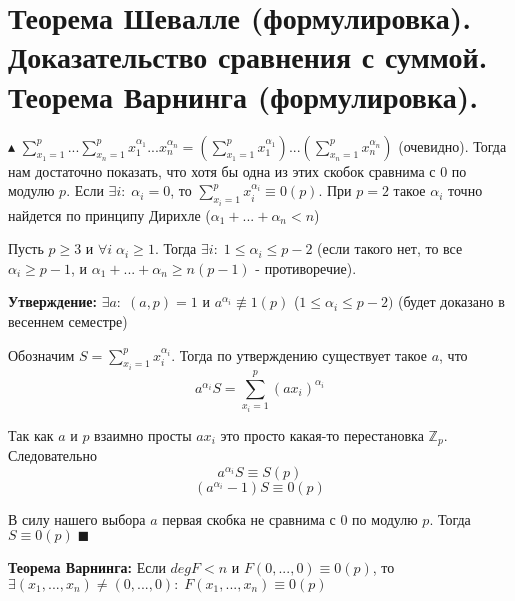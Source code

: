 \section{Теорема Шевалле (формулировка). Доказательство сравнения с суммой. Теорема Варнинга (формулировка).}
\par $\blacktriangle$ $\sum\limits_{x_1=1}^p...\sum\limits_{x_n=1}^px_1^{\alpha_1}...x_n^{\alpha_n} = \left(\sum\limits_{x_1=1}^px_1^{\alpha_1}\right)...\left(\sum\limits_{x_n=1}^px_n^{\alpha_n}\right)$ (очевидно). Тогда нам достаточно показать, что хотя бы одна из этих скобок сравнима с 0 по модулю $p$. Если $\exists i: \; \alpha_i = 0$, то $\sum\limits_{x_i=1}^px_i^{\alpha_i} \equiv 0(p)$. При $p=2$ такое $\alpha_i$ точно найдется по принципу Дирихле ($\alpha_1 + ...+\alpha_n < n$)
\par Пусть $p \geq 3$ и $\forall i \; \alpha_i \geq 1$. Тогда $\exists i: \; 1 \leq \alpha_i \leq p-2$ (если такого нет, то все $\alpha_i \geq p-1$, и $\alpha_1+...+\alpha_n \geq n(p-1)$ - противоречие).
\par \textbf{Утверждение: } $\exists a: \; (a,p)=1$ и $a^{\alpha_i} \not\equiv 1(p)$ ($1 \leq \alpha_i \leq p-2)$ (будет доказано в весеннем семестре)
\par Обозначим $S = \sum\limits_{x_i=1}^p x_i^{\alpha_i}$. Тогда по утверждению существует такое $a$, что
$$a^{\alpha_i}S=\sum_{x_i=1}^p (a x_i)^{\alpha_i}$$
\par Так как $a$ и $p$ взаимно просты $a x_i$ это просто какая-то перестановка $\mathbb{Z}_p$. Следовательно
$$a^{\alpha_i}S \equiv S (p)$$
$$(a^{\alpha_i}-1)S \equiv 0 (p)$$
\par В силу нашего выбора $a$ первая скобка не сравнима с 0 по модулю $p$. Тогда $S \equiv 0 (p) \; \blacksquare$ 
\par \textbf{Теорема Варнинга: } Если $deg F < n$ и $F(0, ..., 0) \equiv 0(p)$, то $\exists(x_1, ..., x_n) \neq (0, ..., 0): \; F(x_1, ..., x_n) \equiv 0 (p)$

